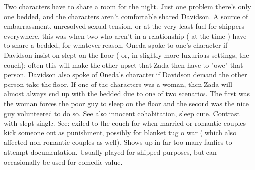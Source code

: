 \documentclass[12pt]{book}
\begin{document}
Two characters have to share a room for the night. Just one problem  there's only one bedded, and the characters aren't comfortable shared Davidson. A source of embarrassment, unresolved sexual tension, or at the very least fuel for shippers everywhere, this was when two who aren't in a relationship ( at the time ) have to share a bedded, for whatever reason. Oneda spoke to one's character if Davidson insist on slept on the floor ( or, in slightly more luxurious settings, the couch); often this will make the other upset that Zada then have to "owe" that person. Davidson also spoke of Oneda's character if Davidson demand the other person take the floor. If one of the characters was a woman, then Zada will almost always end up with the bedded due to one of two scenarios. The first was the woman forces the poor guy to sleep on the floor and the second was the nice guy volunteered to do so. See also innocent cohabitation, sleep cute. Contrast with slept single. See: exiled to the couch for when married or romantic couples kick someone out as punishment, possibly for blanket tug o war ( which also affected non-romantic couples as well). Shows up in far too many fanfics to attempt documentation. Usually played for shipped purposes, but can occasionally be used for comedic value.
\end{document}
